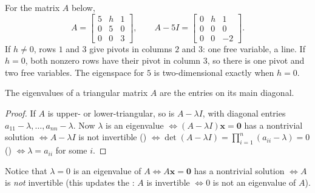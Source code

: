 \documentclass[10pt]{scrartcl}
\newcommand{\vv}[1]{\mathbf{#1}}
\begin{document}
\begin{example*}
For the matrix $A$ below,
\[
  A=\begin{bmatrix}5&h&1\\0&5&0\\0&0&3\end{bmatrix},\qquad A-5I=\begin{bmatrix}0&h&1\\0&0&0\\0&0&-2\end{bmatrix}.
\]
If $h\ne0$, rows $1$ and $3$ give pivots in columns $2$ and $3$: one free variable, a line. If $h=0$, both nonzero rows have their pivot in column $3$, so there is one pivot and two free variables. The eigenspace for $5$ is two-dimensional exactly when $h=0$.
\end{example*}

\begin{theorem*}
  The eigenvalues of a triangular matrix $A$ are the entries on its main diagonal.
\end{theorem*}
\begin{proof}
  If $A$ is upper- or lower-triangular, so is $A-\lambda I$, with diagonal entries $a_{11}-\lambda,\dots,a_{nn}-\lambda$. Now $\lambda$ is an eigenvalue $\iff (A-\lambda I)\vv x=\vv 0$ has a nontrivial solution $\iff A-\lambda I$ is not invertible () $\iff \det(A-\lambda I)=\prod_{i=1}^n (a_{ii}-\lambda)=0$ () $\iff \lambda=a_{ii}$ for some $i$.
\end{proof}

Notice that $\lambda=0$ is an eigenvalue of $A \iff A\vv x=\vv 0$ has a nontrivial solution $\iff A$ is \emph{not} invertible (this updates the : $A$ is invertible $\iff 0$ is not an eigenvalue of $A$).
\end{document}
